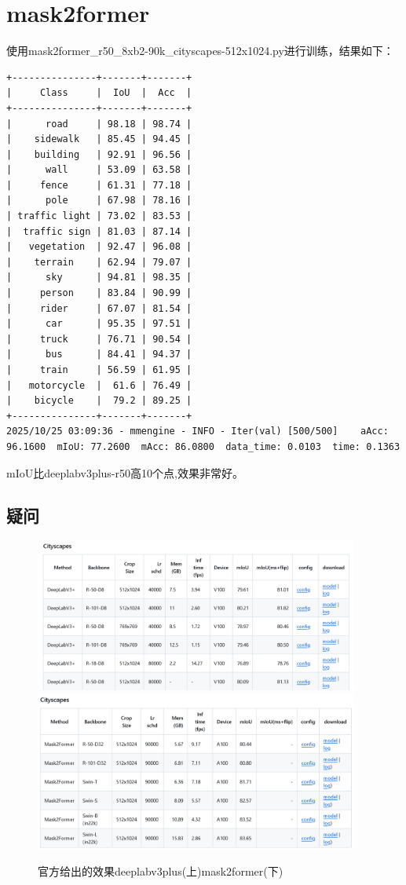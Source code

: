 \documentclass[12pt]{ctexart}
\begin{document}
\section{mask2former}
使用mask2former\_r50\_8xb2-90k\_cityscapes-512x1024.py进行训练，结果如下：
\begin{lstlisting}
+---------------+-------+-------+
|     Class     |  IoU  |  Acc  |
+---------------+-------+-------+
|      road     | 98.18 | 98.74 |
|    sidewalk   | 85.45 | 94.45 |
|    building   | 92.91 | 96.56 |
|      wall     | 53.09 | 63.58 |
|     fence     | 61.31 | 77.18 |
|      pole     | 67.98 | 78.16 |
| traffic light | 73.02 | 83.53 |
|  traffic sign | 81.03 | 87.14 |
|   vegetation  | 92.47 | 96.08 |
|    terrain    | 62.94 | 79.07 |
|      sky      | 94.81 | 98.35 |
|     person    | 83.84 | 90.99 |
|     rider     | 67.07 | 81.54 |
|      car      | 95.35 | 97.51 |
|     truck     | 76.71 | 90.54 |
|      bus      | 84.41 | 94.37 |
|     train     | 56.59 | 61.95 |
|   motorcycle  |  61.6 | 76.49 |
|    bicycle    |  79.2 | 89.25 |
+---------------+-------+-------+
2025/10/25 03:09:36 - mmengine - INFO - Iter(val) [500/500]    aAcc: 96.1600  mIoU: 77.2600  mAcc: 86.0800  data_time: 0.0103  time: 0.1363
\end{lstlisting}
mIoU比deeplabv3plus-r50高10个点,效果非常好。
\subsection{疑问}
\begin{figure}[H]  %
    \centering        %
    \includegraphics[width=0.95\textwidth]{result/question/deeplabv3plus.png}
    \includegraphics[width=0.95\textwidth]{result/question/mask2former.png}
    \caption{官方给出的效果deeplabv3plus(上)mask2former(下)}
    \label{fig:question}
\end{figure}
\end{document}

